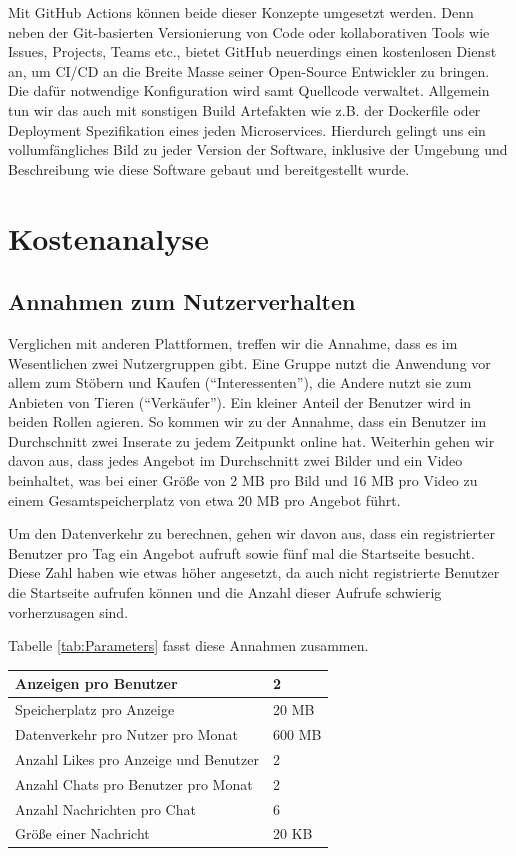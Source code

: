 \documentclass{article}
\begin{document}
Mit GitHub Actions können beide dieser Konzepte umgesetzt werden. Denn neben der Git-basierten Versionierung von Code oder kollaborativen Tools wie Issues, Projects, Teams etc., bietet GitHub neuerdings einen kostenlosen Dienst an, um CI/CD an die Breite Masse seiner Open-Source Entwickler zu bringen. Die dafür notwendige Konfiguration wird samt Quellcode verwaltet. Allgemein tun wir das auch mit sonstigen Build Artefakten wie z.B. der Dockerfile oder Deployment Spezifikation eines jeden Microservices. Hierdurch gelingt uns ein vollumfängliches Bild zu jeder Version der Software, inklusive der Umgebung und Beschreibung wie diese Software gebaut und bereitgestellt wurde.


\section{Kostenanalyse}


\subsection{Annahmen zum Nutzerverhalten}

Verglichen mit anderen Plattformen, treffen wir die Annahme, dass es im Wesentlichen zwei Nutzergruppen gibt. Eine Gruppe nutzt die Anwendung vor allem zum Stöbern und Kaufen (\enquote{Interessenten}), die Andere nutzt sie zum Anbieten von Tieren (\enquote{Verkäufer}). Ein kleiner Anteil der Benutzer wird in beiden Rollen agieren. So kommen wir zu der Annahme, dass ein Benutzer im Durchschnitt zwei Inserate zu jedem Zeitpunkt online hat. Weiterhin gehen wir davon aus, dass jedes Angebot im Durchschnitt zwei Bilder und ein Video beinhaltet, was bei einer Größe von 2 MB pro Bild und 16 MB pro Video zu einem Gesamtspeicherplatz von etwa 20 MB pro Angebot führt.

Um den Datenverkehr zu berechnen, gehen wir davon aus, dass ein registrierter Benutzer pro Tag ein Angebot aufruft sowie fünf mal die Startseite besucht. Diese Zahl haben wie etwas höher angesetzt, da auch nicht registrierte Benutzer die Startseite aufrufen können und die Anzahl dieser Aufrufe schwierig vorherzusagen sind.

Tabelle \ref{tab:Parameters} fasst diese Annahmen zusammen.

\begin{center}\label{tab:Parameters}
\begin{tabular}{|l|l|}
    \hline
    Anzeigen pro Benutzer & 2 \\ \hline
    Speicherplatz pro Anzeige & 20 MB \\ \hline
    Datenverkehr pro Nutzer pro Monat & 600 MB \\ \hline
    Anzahl Likes pro Anzeige und Benutzer & 2 \\ \hline
    Anzahl Chats pro Benutzer pro Monat & 2 \\\hline
    Anzahl Nachrichten pro Chat & 6 \\\hline
    Größe einer Nachricht & 20 KB \\ \hline
\end{tabular}
\end{center}
\end{document}
